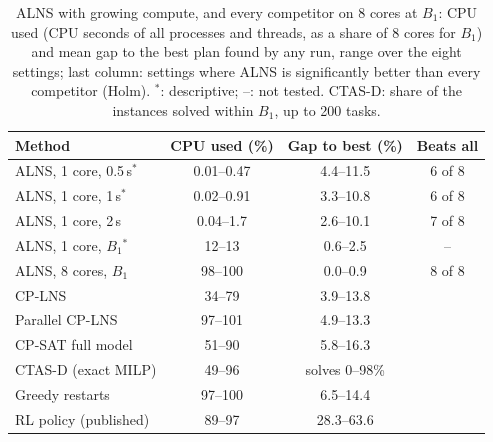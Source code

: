 \begin{table}[t]
\centering
\small
\setlength{\tabcolsep}{4pt}
\caption{ALNS with growing compute, and every competitor on 8 cores at $B_1$: CPU used (CPU seconds of all processes and threads, as a share of 8 cores for $B_1$) and mean gap to the best plan found by any run, range over the eight settings; last column: settings where ALNS is significantly better than every competitor (Holm). $^*$: descriptive; --: not tested. CTAS-D: share of the instances solved within $B_1$, up to 200 tasks.}
\label{tab:methods}
\begin{tabular}{lccc}
\toprule
Method & CPU used (\%) & Gap to best (\%) & Beats all \\
\midrule
ALNS, 1 core, 0.5\,s$^*$ & 0.01--0.47 & 4.4--11.5 & 6 of 8 \\
ALNS, 1 core, 1\,s$^*$ & 0.02--0.91 & 3.3--10.8 & 6 of 8 \\
ALNS, 1 core, 2\,s & 0.04--1.7 & 2.6--10.1 & 7 of 8 \\
ALNS, 1 core, $B_1$$^*$ & 12--13 & 0.6--2.5 & -- \\
ALNS, 8 cores, $B_1$ & 98--100 & 0.0--0.9 & 8 of 8 \\
\midrule
CP-LNS & 34--79 & 3.9--13.8 & \\
Parallel CP-LNS & 97--101 & 4.9--13.3 & \\
CP-SAT full model & 51--90 & 5.8--16.3 & \\
CTAS-D (exact MILP) & 49--96 & solves 0--98\% & \\
Greedy restarts & 97--100 & 6.5--14.4 & \\
RL policy (published) & 89--97 & 28.3--63.6 & \\
\bottomrule
\end{tabular}
\end{table}
